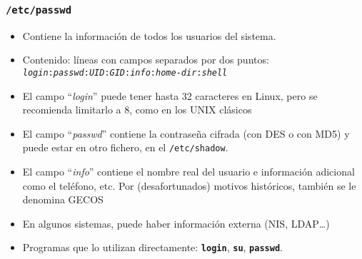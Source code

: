 \documentclass[ucs]{beamer}
\begin{document}
\begin{frame}[fragile]
  \frametitle{\texttt{/etc/passwd}}
  \begin{itemize}
    \item Contiene la información de todos los usuarios del sistema.
    \item Contenido: líneas con campos separados por dos puntos:\\
      \texttt{\emph{login}:\emph{passwd}:\emph{UID}:\emph{GID}:\emph{info}:\emph{home-dir}:\emph{shell}}

    \item El campo ``\emph{login}'' puede tener hasta 32 caracteres en Linux, pero se recomienda
limitarlo a 8, como en los UNIX clásicos

    \item El campo ``\emph{passwd}'' contiene la contraseña cifrada (con DES o con MD5) y puede estar en
      otro fichero, en el \verb+/etc/shadow+.
    \item El campo ``\emph{info}'' contiene el nombre real del usuario e información
 adicional como el teléfono, etc.
Por (desafortunados) motivos históricos, también se le denomina GECOS

%
    \item En algunos sistemas, puede haber información externa (NIS, LDAP\ldots)
    \item Programas que lo utilizan directamente: \texttt{\textbf{login}}, \texttt{\textbf{su}}, \texttt{\textbf{passwd}}.
  \end{itemize}
\end{frame}
\end{document}

